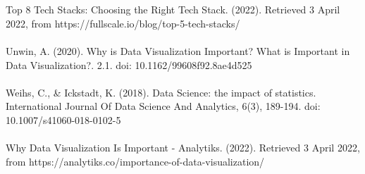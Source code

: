 \documentclass[a4paper, 11pt]{report}
\begin{document}
\\
\\
Top 8 Tech Stacks: Choosing the Right Tech Stack. (2022). Retrieved 3 April 2022, from https://fullscale.io/blog/top-5-tech-stacks/
\\
\\
Unwin, A. (2020). Why is Data Visualization Important? What is Important in Data Visualization?. 2.1. doi: 10.1162/99608f92.8ae4d525
\\
\\
Weihs, C., & Ickstadt, K. (2018). Data Science: the impact of statistics. International Journal Of Data Science And Analytics, 6(3), 189-194. doi: 10.1007/s41060-018-0102-5
\\
\\
Why Data Visualization Is Important - Analytiks. (2022). Retrieved 3 April 2022, from https://analytiks.co/importance-of-data-visualization/
\end{document}
